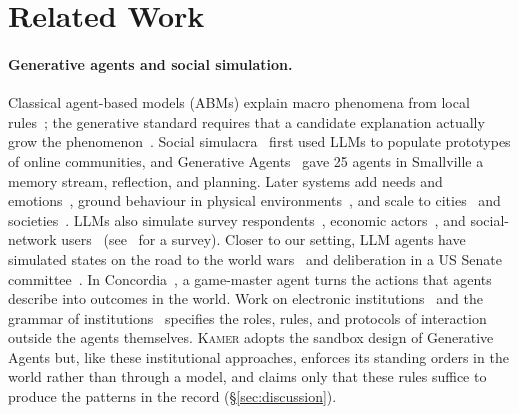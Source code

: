 \documentclass[sigconf,review,anonymous]{acmart}
\newcommand{\sys}{\textsc{Kamer}}
\begin{document}
\section{Related Work}
\label{sec:related}

\paragraph{Generative agents and social simulation.} Classical
agent-based models (ABMs) explain macro phenomena from local
rules~\cite{schelling1971dynamic,epstein1996growing}; the generative
standard requires that a candidate explanation actually grow the
phenomenon~\cite{epstein2006generative}. Social
simulacra~\cite{park2022social} first used LLMs to populate prototypes of
online communities, and Generative Agents~\cite{park2023generative} gave
25 agents in Smallville a memory stream, reflection, and planning. Later
systems add needs and emotions~\cite{wang2023humanoid}, ground behaviour
in physical environments~\cite{wu2025indoorworld},
and scale to cities~\cite{bougie2025citysim} and
societies~\cite{al2024projectsid,piao2025agentsociety}. LLMs also simulate
survey respondents~\cite{argyle2023outofone,aher2023turing}, economic
actors~\cite{horton2023homosilicus}, and social-network
users~\cite{gao2023s3,tornberg2023simulating} (see~\cite{gao2024llmabm}
for a survey). Closer to our setting, LLM agents have simulated states on
the road to the world wars~\cite{hua2023waragent} and deliberation in a US Senate
committee~\cite{baker2024senate}. In Concordia~\cite{vezhnevets2023concordia},
a game-master agent turns the actions that agents describe into outcomes
in the world. Work on electronic institutions~\cite{esteva2001electronic}
and the grammar of institutions~\cite{crawford1995grammar} specifies the
roles, rules, and protocols of interaction outside the agents themselves.
\sys{} adopts the sandbox design of Generative Agents but, like these
institutional approaches, enforces its standing orders in the world rather
than through a model, and claims only that these rules suffice to produce
the patterns in the record (\S\ref{sec:discussion}).
\end{document}
